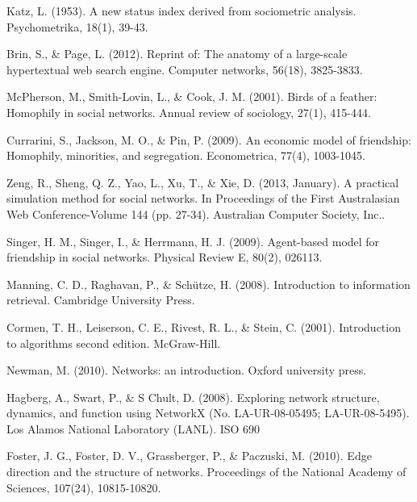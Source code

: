 \documentclass[a4paper,12pt]{article}
\begin{document}
\begin{thebibliography}{9}
  Katz, L. (1953). A new status index derived from sociometric analysis. Psychometrika, 18(1), 39-43.

  Brin, S., \& Page, L. (2012). Reprint of: The anatomy of a large-scale hypertextual web search engine. Computer networks, 56(18), 3825-3833.

  McPherson, M., Smith-Lovin, L., \& Cook, J. M. (2001). Birds of a feather: Homophily in social networks. Annual review of sociology, 27(1), 415-444.
  
  Currarini, S., Jackson, M. O., \& Pin, P. (2009). An economic model of friendship: Homophily, minorities, and segregation. Econometrica, 77(4), 1003-1045.
  
  Zeng, R., Sheng, Q. Z., Yao, L., Xu, T., \& Xie, D. (2013, January). A practical simulation method for social networks. In Proceedings of the First Australasian Web Conference-Volume 144 (pp. 27-34). Australian Computer Society, Inc..
  
  Singer, H. M., Singer, I., \& Herrmann, H. J. (2009). Agent-based model for friendship in social networks. Physical Review E, 80(2), 026113.

  Manning, C. D., Raghavan, P., \& Schütze, H. (2008). Introduction to information retrieval. Cambridge University Press.
  
  Cormen, T. H., Leiserson, C. E., Rivest, R. L., \& Stein, C. (2001). Introduction to algorithms second edition. McGraw-Hill.
  
  Newman, M. (2010). Networks: an introduction. Oxford university press.
  
  Hagberg, A., Swart, P., \& S Chult, D. (2008). Exploring network structure, dynamics, and function using NetworkX (No. LA-UR-08-05495; LA-UR-08-5495). Los Alamos National Laboratory (LANL).
ISO 690	

  Foster, J. G., Foster, D. V., Grassberger, P., \& Paczuski, M. (2010). Edge direction and the structure of networks. Proceedings of the National Academy of Sciences, 107(24), 10815-10820.
\end{thebibliography}
\end{document}
